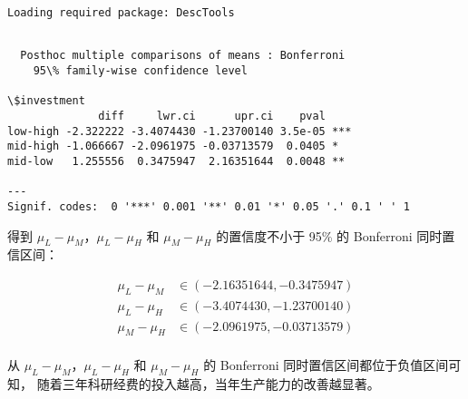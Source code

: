 \documentclass[11pt]{article}
\begin{document}
    \begin{Verbatim}[commandchars=\\\{\}]
Loading required package: DescTools

    \end{Verbatim}

    
    \begin{Verbatim}[commandchars=\\\{\}]

  Posthoc multiple comparisons of means : Bonferroni 
    95\% family-wise confidence level

\$investment
              diff     lwr.ci      upr.ci    pval    
low-high -2.322222 -3.4074430 -1.23700140 3.5e-05 ***
mid-high -1.066667 -2.0961975 -0.03713579  0.0405 *  
mid-low   1.255556  0.3475947  2.16351644  0.0048 ** 

---
Signif. codes:  0 '***' 0.001 '**' 0.01 '*' 0.05 '.' 0.1 ' ' 1

    \end{Verbatim}

    
    得到 \(\mu_L-\mu_M\)，\(\mu_L-\mu_H\) 和 \(\mu_M-\mu_H\) 的置信度不小于
95\% 的 Bonferroni 同时置信区间：

\[
\begin{aligned}
\mu_L-\mu_M & \in (-2.16351644, -0.3475947  ) \\
\mu_L-\mu_H & \in (-3.4074430, -1.23700140) \\
\mu_M-\mu_H & \in (-2.0961975, -0.03713579) \\
\end{aligned}
\]

    从 \(\mu_L-\mu_M\)，\(\mu_L-\mu_H\) 和 \(\mu_M-\mu_H\) 的 Bonferroni
同时置信区间都位于负值区间可知，
随着三年科研经费的投入越高，当年生产能力的改善越显著。


    
    
    
\end{document}
